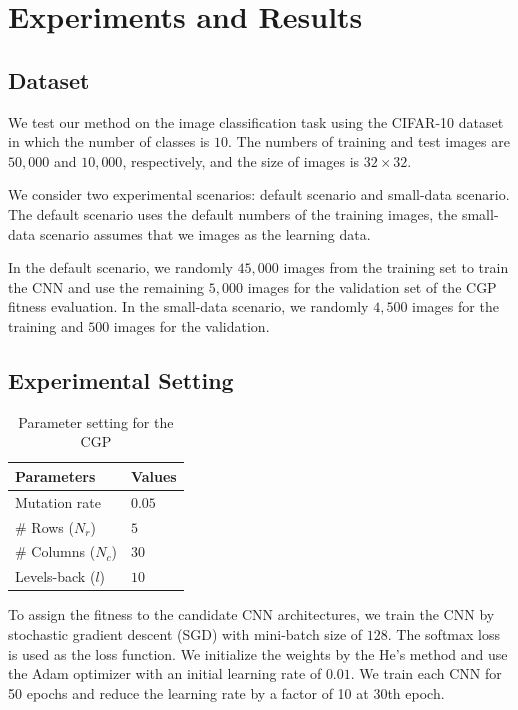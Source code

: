\section{Experiments and Results}
\subsection{Dataset}
We test our method on the image classification task using the CIFAR-10 dataset in which the number of classes is $10$. The numbers of training and test images are $50,000$ and $10,000$, respectively, and the size of images is $32 \times 32$.

We consider two experimental scenarios:  default scenario and  small-data scenario.
The default scenario uses the default numbers of the training images,  the small-data scenario assumes that we  images as the learning data. 

In the default scenario, we randomly  $45,000$ images from the training set to train the CNN\new{,} and  use the remaining $5,000$ images for the validation set of the CGP fitness evaluation.
In the small-data scenario, we randomly  $4,500$ images for the training and $500$ images for the validation.

\subsection{Experimental Setting}

\begin{table}[t]
  \caption{Parameter setting for the CGP}
  \label{cgp_param}
  \begin{tabular}{l|l} \hline
    Parameters & Values \\ \hline
   Mutation rate & $0.05$ \\
   \#  Rows ($N_r$) & $5$ \\
   \#  Columns ($N_c$) & $30$ \\
   Levels-back ($l$) & $10$ \\ \hline
  \end{tabular}
\end{table}


To assign the fitness to the candidate CNN architectures, we train the CNN by stochastic gradient descent (SGD) with  mini-batch size of $128$. The softmax  loss is used as the loss function.
We initialize the weights by the He's method \cite{he_delving_2015} and use the Adam optimizer \cite{kingma_adam:_2015} with an initial learning rate of $0.01$. 
We train each CNN for 50 epochs and reduce the learning rate by a factor of 10 at 30th epoch.


